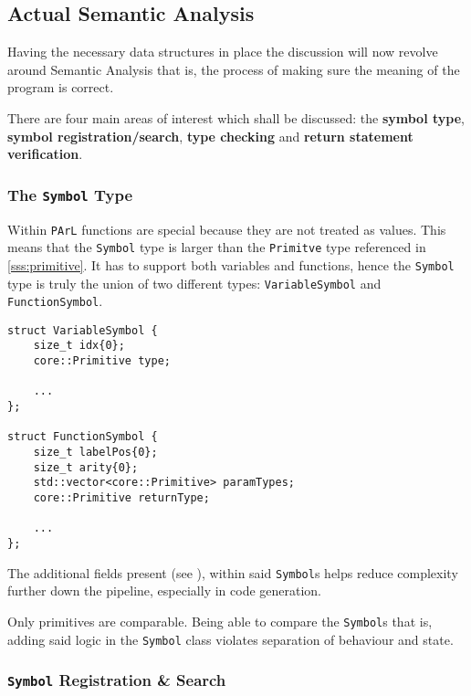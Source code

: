 \subsection{Actual Semantic Analysis}

Having the necessary data structures in place the discussion
will now revolve around Semantic Analysis that is, the process
of making sure the meaning of the program is correct.

There are four main areas of interest which shall be discussed:
the \textbf{symbol type}, \textbf{symbol registration/search},
\textbf{type checking} and \textbf{return statement
verification}.

\subsubsection{The \texttt{Symbol} Type}

Within \texttt{PArL} functions are special because they are not
treated as values. This means that the \texttt{Symbol} type is
larger than the \texttt{Primitve} type referenced in
\ref{sss:primitive}. It has to support both variables and
functions, hence the \texttt{Symbol} type is truly the union of
two different types: \texttt{VariableSymbol} and
\texttt{FunctionSymbol}.

\begin{lstlisting}[caption={ \texttt{VariableSymbol} and
\texttt{FunctionSymbol} class declarations
(backend/Symbol.hpp).},label=lst:symbols]
struct VariableSymbol {
    size_t idx{0};
    core::Primitive type;

    ...
};

struct FunctionSymbol {
    size_t labelPos{0};
    size_t arity{0};
    std::vector<core::Primitive> paramTypes;
    core::Primitive returnType;

    ...
};
\end{lstlisting}

The additional fields present (see ), within
said \texttt{Symbol}s helps reduce complexity further down the
pipeline, especially in code generation.

\begin{note}
Only primitives are comparable. Being able to compare the
\texttt{Symbol}s that is, adding said logic in the
\texttt{Symbol} class violates separation of behaviour and
state.
\end{note}

\subsubsection{\texttt{Symbol} Registration \& Search}

